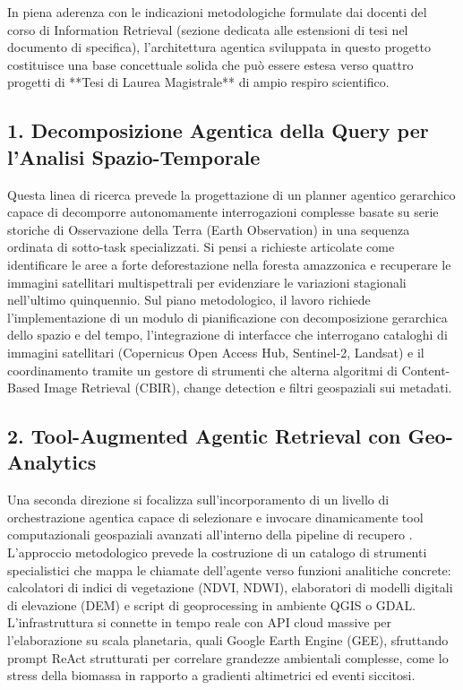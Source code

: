In piena aderenza con le indicazioni metodologiche formulate dai docenti del corso di Information Retrieval (sezione dedicata alle estensioni di tesi nel documento di specifica), l'architettura agentica sviluppata in questo progetto costituisce una base concettuale solida che può essere estesa verso quattro progetti di **Tesi di Laurea Magistrale** di ampio respiro scientifico.

\subsection{1. Decomposizione Agentica della Query per l'Analisi Spazio-Temporale}
Questa linea di ricerca prevede la progettazione di un planner agentico gerarchico capace di decomporre autonomamente interrogazioni complesse basate su serie storiche di Osservazione della Terra (Earth Observation) in una sequenza ordinata di sotto-task specializzati. Si pensi a richieste articolate come identificare le aree a forte deforestazione nella foresta amazzonica e recuperare le immagini satellitari multispettrali per evidenziare le variazioni stagionali nell'ultimo quinquennio. Sul piano metodologico, il lavoro richiede l'implementazione di un modulo di pianificazione con decomposizione gerarchica dello spazio e del tempo, l'integrazione di interfacce che interrogano cataloghi di immagini satellitari (Copernicus Open Access Hub, Sentinel-2, Landsat) e il coordinamento tramite un gestore di strumenti che alterna algoritmi di Content-Based Image Retrieval (CBIR), change detection e filtri geospaziali sui metadati.

\subsection{2. Tool-Augmented Agentic Retrieval con Geo-Analytics}
Una seconda direzione si focalizza sull'incorporamento di un livello di orchestrazione agentica capace di selezionare e invocare dinamicamente tool computazionali geospaziali avanzati all'interno della pipeline di recupero \cite{lee2025multiagent}. L'approccio metodologico prevede la costruzione di un catalogo di strumenti specialistici che mappa le chiamate dell'agente verso funzioni analitiche concrete: calcolatori di indici di vegetazione (NDVI, NDWI), elaboratori di modelli digitali di elevazione (DEM) e script di geoprocessing in ambiente QGIS o GDAL. L'infrastruttura si connette in tempo reale con API cloud massive per l'elaborazione su scala planetaria, quali Google Earth Engine (GEE), sfruttando prompt ReAct strutturati per correlare grandezze ambientali complesse, come lo stress della biomassa in rapporto a gradienti altimetrici ed eventi siccitosi.

